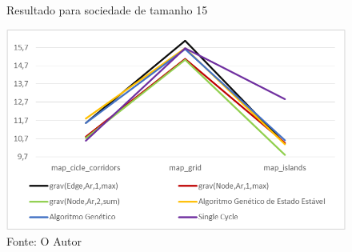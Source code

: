 \begin{figure}
	\caption[Resultado para sociedade de tamanho 15]{Resultado para sociedade 
		de tamanho 15}
	\centering
	\includegraphics[width=\columnwidth]{images/graph_agent4.png}
	\caption*{Fonte: O Autor}
	\label{fig:graph_agentes4}
\end{figure}